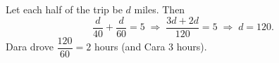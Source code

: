 Let each half of the trip be $d$ miles. Then
\[
\dfrac{d}{40}+\dfrac{d}{60}=5\;\Longrightarrow\;\dfrac{3d+2d}{120}=5\;\Longrightarrow\;d=120 .
\]
Dara drove $\dfrac{120}{60}=\boxed{2}$ hours (and Cara $3$ hours).
